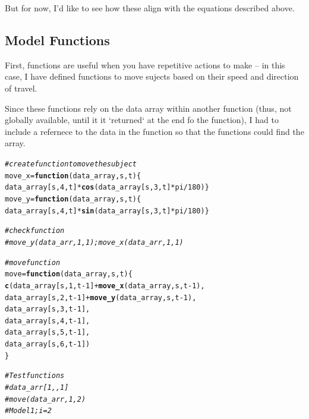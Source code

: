 \documentclass{article}\usepackage[]{graphicx}\usepackage[]{color}
\makeatletter
\newcommand{\hlnum}[1]{\textcolor[rgb]{0.686,0.059,0.569}{#1}}%
\newcommand{\hlcom}[1]{\textcolor[rgb]{0.678,0.584,0.686}{\textit{#1}}}%
\newcommand{\hlopt}[1]{\textcolor[rgb]{0,0,0}{#1}}%
\newcommand{\hlstd}[1]{\textcolor[rgb]{0.345,0.345,0.345}{#1}}%
\newcommand{\hlkwa}[1]{\textcolor[rgb]{0.161,0.373,0.58}{\textbf{#1}}}%
\newcommand{\hlkwb}[1]{\textcolor[rgb]{0.69,0.353,0.396}{#1}}%
\newcommand{\hlkwc}[1]{\textcolor[rgb]{0.333,0.667,0.333}{#1}}%
\newcommand{\hlkwd}[1]{\textcolor[rgb]{0.737,0.353,0.396}{\textbf{#1}}}%
\newenvironment{kframe}{%
 \def\at@end@of@kframe{}%
 \ifinner\ifhmode%
  \def\at@end@of@kframe{\end{minipage}}%
  \begin{minipage}{\columnwidth}%
 \fi\fi%
 \def\FrameCommand##1{\hskip\@totalleftmargin \hskip-\fboxsep
 \colorbox{shadecolor}{##1}\hskip-\fboxsep
     \hskip-\linewidth \hskip-\@totalleftmargin \hskip\columnwidth}%
 \MakeFramed {\advance\hsize-\width
   \@totalleftmargin\z@ \linewidth\hsize
   \@setminipage}}%
 {\par\unskip\endMakeFramed%
 \at@end@of@kframe}
\newenvironment{knitrout}{}{} %
\makeatother
\begin{document}
But for now, I'd like to see how these align with the equations described above.

\subsection{Model Functions}

First, functions are useful when you have repetitive actions to make -- in this case, I have defined functions to move sujects based on their speed and direction of travel. 

Since these functions rely on the data array within another function (thus, not globally available, until it it `returned` at the end fo the function), I had to include a refernece to the data in the function so that the functions could find the array.

\begin{knitrout}
\color{fgcolor}\begin{kframe}
\begin{alltt}
\hlcom{#create function to move the subject}
\hlstd{move_x} \hlkwb{=} \hlkwa{function}\hlstd{(}\hlkwc{data_array}\hlstd{,} \hlkwc{s}\hlstd{,} \hlkwc{t}\hlstd{)\{}
\hlstd{data_array[s,} \hlnum{4}\hlstd{, t]} \hlopt{*} \hlkwd{cos}\hlstd{(data_array[s,}\hlnum{3}\hlstd{, t]}\hlopt{*}\hlstd{pi}\hlopt{/}\hlnum{180}\hlstd{)\}}
\hlstd{move_y} \hlkwb{=} \hlkwa{function}\hlstd{(}\hlkwc{data_array}\hlstd{,} \hlkwc{s}\hlstd{,} \hlkwc{t}\hlstd{)\{}
\hlstd{data_array[s,} \hlnum{4}\hlstd{, t]} \hlopt{*} \hlkwd{sin}\hlstd{(data_array[s,}\hlnum{3}\hlstd{, t]}\hlopt{*}\hlstd{pi}\hlopt{/}\hlnum{180}\hlstd{)\}}

\hlcom{# check function }
\hlcom{# move_y(data_arr, 1, 1); move_x(data_arr, 1,1)}

\hlcom{# move function}
\hlstd{move} \hlkwb{=} \hlkwa{function}\hlstd{(}\hlkwc{data_array}\hlstd{,} \hlkwc{s}\hlstd{,} \hlkwc{t}\hlstd{)\{}
  \hlkwd{c}\hlstd{(data_array[s,} \hlnum{1}\hlstd{, t}\hlopt{-}\hlnum{1}\hlstd{]}\hlopt{+} \hlkwd{move_x}\hlstd{(data_array, s, t}\hlopt{-}\hlnum{1}\hlstd{),}
    \hlstd{data_array[s,} \hlnum{2}\hlstd{, t}\hlopt{-}\hlnum{1}\hlstd{]}\hlopt{+} \hlkwd{move_y}\hlstd{(data_array, s, t}\hlopt{-}\hlnum{1}\hlstd{),}
    \hlstd{data_array[s,} \hlnum{3}\hlstd{, t}\hlopt{-}\hlnum{1}\hlstd{],}
    \hlstd{data_array[s,} \hlnum{4}\hlstd{, t}\hlopt{-}\hlnum{1}\hlstd{],}
    \hlstd{data_array[s,} \hlnum{5}\hlstd{, t}\hlopt{-}\hlnum{1}\hlstd{],}
    \hlstd{data_array[s,} \hlnum{6}\hlstd{, t}\hlopt{-}\hlnum{1}\hlstd{])}
\hlstd{\}}

\hlcom{# Test functions}
\hlcom{# data_arr[1,,1]}
\hlcom{# move(data_arr, 1, 2)}
\hlcom{# Model1; i = 2}
\end{alltt}
\end{kframe}
\end{knitrout}
\end{document}
